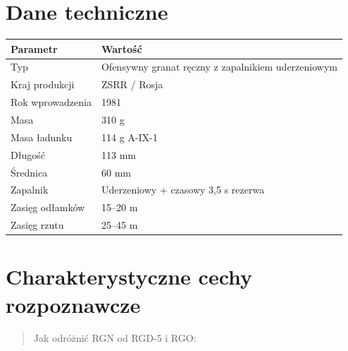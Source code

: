 \documentclass[12pt,openany,oneside]{book}
\begin{document}
\section{Dane techniczne}\label{dane-techniczne-103}

\begin{longtable}[]{@{}ll@{}}
\toprule\noalign{}
Parametr & Wartość \\
\midrule\noalign{}
\endhead
\bottomrule\noalign{}
\endlastfoot
Typ & Ofensywny granat ręczny z zapalnikiem uderzeniowym \\
Kraj produkcji & ZSRR / Rosja \\
Rok wprowadzenia & 1981 \\
Masa & 310 g \\
Masa ładunku & 114 g A-IX-1 \\
Długość & 113 mm \\
Średnica & 60 mm \\
Zapalnik & Uderzeniowy + czasowy 3,5 s rezerwa \\
Zasięg odłamków & 15--20 m \\
Zasięg rzutu & 25--45 m \\
\end{longtable}

\section{Charakterystyczne cechy
rozpoznawcze}\label{charakterystyczne-cechy-rozpoznawcze-103}

\begin{quote}
Jak odróżnić RGN od RGD-5 i RGO:
\end{quote}
\end{document}
